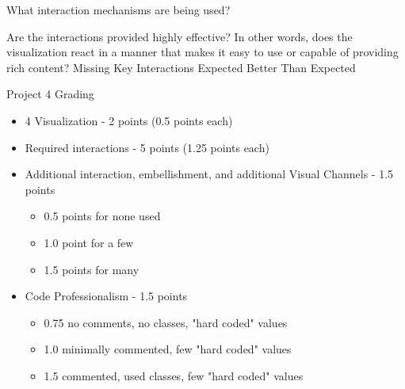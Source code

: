 \documentclass[a4paper,12pt]{article}
\begin{document}
\EndTable  
 
        
\vspace{15pt}   
 

   	{What interaction mechanisms are being used?}
    {
    }
        
	{Are the interactions provided highly effective? In other words, does 
    	the visualization react in a manner that makes it easy to use or 
        capable of providing rich content?}
    {\choice Missing Key Interactions}
    {\choice Expected}
    {\choice Better Than Expected}
    
\EndTable



\newpage


\begin{center}
{\huge Project 4 Grading}
\end{center}

\begin{itemize}
	\item 4 Visualization - 2 points (0.5 points each)
	\item Required interactions - 5 points (1.25 points each)
	\item Additional interaction, embellishment, and additional Visual Channels - 1.5 points 
		\begin{itemize}
    		\item 0.5 points for none used
    		\item 1.0 point for a few
            \item 1.5 points for many
		\end{itemize}
	\item Code Professionalism - 1.5 points
		\begin{itemize}
            \item 0.75 no comments, no classes, "hard coded" values
            \item 1.0 minimally commented, few "hard coded" values
            \item 1.5 commented, used classes, few "hard coded" values
		\end{itemize}
\end{itemize}
\end{document}

